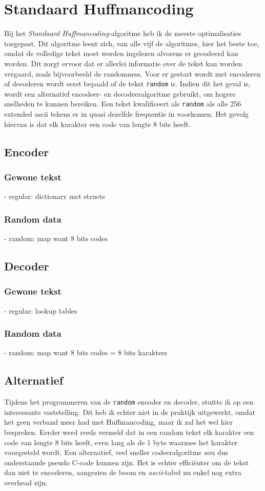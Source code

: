 \section{Standaard Huffmancoding}

Bij het \emph{Standaard Huffmancoding}-algoritme heb ik de meeste optimalisaties toegepast. Dit algoritme leent zich, van alle vijf de algoritmes, hier het beste toe, omdat de volledige tekst moet worden ingelezen alvorens er gecodeerd kan worden. Dit zorgt ervoor dat er allerlei informatie over de tekst kan worden vergaard, zoals bijvoorbeeld de randomness. Voor er gestart wordt met encoderen of decoderen wordt eerst bepaald of de tekst \texttt{random} is. Indien dit het geval is, wordt een alternatief encodeer- en decodeeralgoritme gebruikt, om hogere snelheden te kunnen bereiken. Een tekst kwalificeert als \texttt{random} als alle 256 extended ascii tekens er in quasi dezelfde frequentie in voorkomen. Het gevolg hiervan is dat elk karakter een code van lengte 8 bits heeft.

\subsection{Encoder}

\subsubsection{Gewone tekst}
	- regular: dictionary met structs
	
\subsubsection{Random data}
	- random: map want 8 bits codes
	
\subsection{Decoder}

\subsubsection{Gewone tekst}
	- regular: lookup tables

\subsubsection{Random data}
	- random: map want 8 bits codes = 8 bits karakters

\subsection{Alternatief}
Tijdens het programmeren van de \texttt{random} encoder en decoder, stuitte ik op een interessante vaststelling. Dit heb ik echter niet in de praktijk uitgewerkt, omdat het geen verband meer had met Huffmancoding, maar ik zal het wel hier bespreken. Eerder werd reeds vermeld dat in een random tekst elk karakter een code van lengte 8 bits heeft, even lang als de 1 byte waarmee het karakter voorgesteld wordt. Een alternatief, veel sneller codeeralgoritme zou dus onderstaande pseudo C-code kunnen zijn. Het is echter effici\"enter om de tekst dan niet te encoderen, aangezien de boom en \emph{ascii}-tabel nu enkel nog extra overhead zijn.